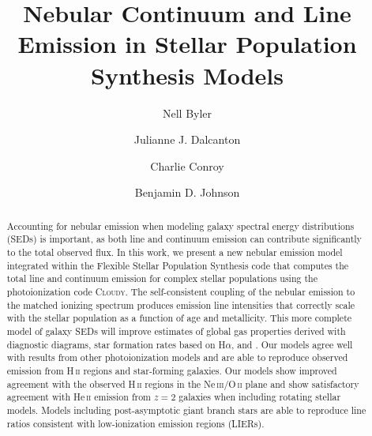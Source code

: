 \documentclass[linenumbers, trackchanges, tighten]{aastex61}%
\begin{document}
\title{Nebular Continuum and Line Emission in Stellar Population Synthesis Models}


\author[0000-0002-7392-3637]{Nell Byler}

\author[0000-0002-1264-2006]{Julianne J. Dalcanton}

\author[0000-0002-1590-8551]{Charlie Conroy}

\author{Benjamin D. Johnson}

\begin{abstract}
Accounting for nebular emission when modeling galaxy spectral energy distributions (SEDs) is important, as both line and continuum emission can contribute significantly to the total observed flux. In this work, we present a new nebular emission model integrated within the Flexible Stellar Population Synthesis code that computes the total line and continuum emission for complex stellar populations using the photoionization code \textsc{Cloudy}. The self-consistent coupling of the nebular emission to the matched ionizing spectrum produces emission line intensities that correctly scale with the stellar population as a function of age and metallicity. This more complete model of galaxy SEDs will improve estimates of global gas properties derived with diagnostic diagrams, star formation rates based on H$\alpha$, and . Our models agree well with results from other photoionization models and are able to reproduce observed emission from H\,\textsc{ii} regions and star-forming galaxies. Our models show improved agreement with the observed H\,\textsc{ii} regions in the Ne\,\textsc{iii}/O\,\textsc{ii} plane and show satisfactory agreement with He\,\textsc{ii} emission from $z=2$ galaxies when including rotating stellar models. Models including post-asymptotic giant branch stars are able to reproduce line ratios consistent with low-ionization emission regions (LIERs).
\end{abstract}
\end{document}
